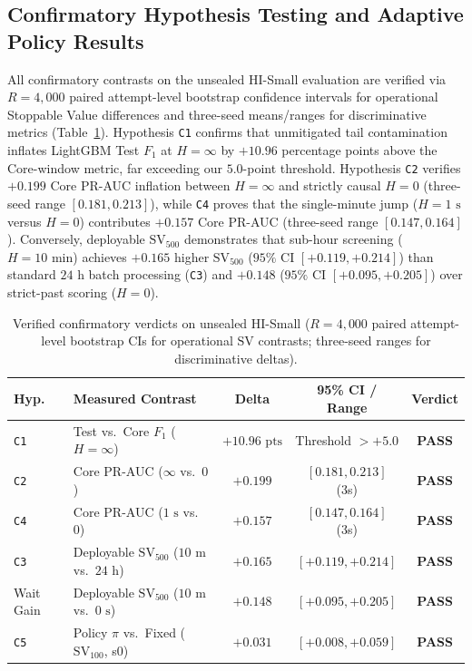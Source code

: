 \documentclass[pdflatex,sn-mathphys,Numbered]{sn-jnl}
\theoremstyle{thmstyleone}
\begin{document}
\subsection{Confirmatory Hypothesis Testing and Adaptive Policy Results}\label{sec:confirmatory_policy}

All confirmatory contrasts on the unsealed HI-Small evaluation are verified via $R = 4{,}000$ paired attempt-level bootstrap confidence intervals for operational Stoppable Value differences and three-seed means/ranges for discriminative metrics (Table~\ref{tab:hypotheses}). Hypothesis \texttt{C1} confirms that unmitigated tail contamination inflates LightGBM Test $F_1$ at $H = \infty$ by $+10.96$ percentage points above the Core-window metric, far exceeding our $5.0$-point threshold. Hypothesis \texttt{C2} verifies $+0.199$ Core PR-AUC inflation between $H = \infty$ and strictly causal $H = 0$ (three-seed range $[0.181, 0.213]$), while \texttt{C4} proves that the single-minute jump ($H = 1\text{ s}$ versus $H = 0$) contributes $+0.157$ Core PR-AUC (three-seed range $[0.147, 0.164]$). Conversely, deployable $\text{SV}_{500}$ demonstrates that sub-hour screening ($H = 10\text{ min}$) achieves $+0.165$ higher $\text{SV}_{500}$ ($95\%$ CI $[+0.119, +0.214]$) than standard $24\text{ h}$ batch processing (\texttt{C3}) and $+0.148$ ($95\%$ CI $[+0.095, +0.205]$) over strict-past scoring ($H = 0$).

\begin{table}[t]
\centering
\caption{Verified confirmatory verdicts on unsealed HI-Small ($R = 4{,}000$ paired attempt-level bootstrap CIs for operational $\text{SV}$ contrasts; three-seed ranges for discriminative deltas).}
\label{tab:hypotheses}
\scriptsize
\setlength{\tabcolsep}{2.4pt}
\begin{tabular}{@{}llccc@{}}
\toprule
\textbf{Hyp.} & \textbf{Measured Contrast} & \textbf{Delta} & \textbf{95\% CI / Range} & \textbf{Verdict} \\
\midrule
\texttt{C1} & Test vs.\ Core $F_1$ ($H = \infty$) & $+10.96\text{ pts}$ & Threshold $> +5.0$ & \textbf{PASS} \\
\texttt{C2} & Core PR-AUC ($\infty$ vs.\ $0$) & $+0.199$ & $[0.181, 0.213]$ (3s) & \textbf{PASS} \\
\texttt{C4} & Core PR-AUC ($1\text{ s}$ vs.\ $0$) & $+0.157$ & $[0.147, 0.164]$ (3s) & \textbf{PASS} \\
\texttt{C3} & Deployable $\text{SV}_{500}$ ($10\text{ m}$ vs.\ $24\text{ h}$) & $+0.165$ & $[+0.119, +0.214]$ & \textbf{PASS} \\
Wait Gain & Deployable $\text{SV}_{500}$ ($10\text{ m}$ vs.\ $0\text{ s}$) & $+0.148$ & $[+0.095, +0.205]$ & \textbf{PASS} \\
\texttt{C5} & Policy $\pi$ vs.\ Fixed ($\text{SV}_{100}$, s0) & $+0.031$ & $[+0.008, +0.059]$ & \textbf{PASS} \\
\bottomrule
\end{tabular}
\end{table}
\end{document}
